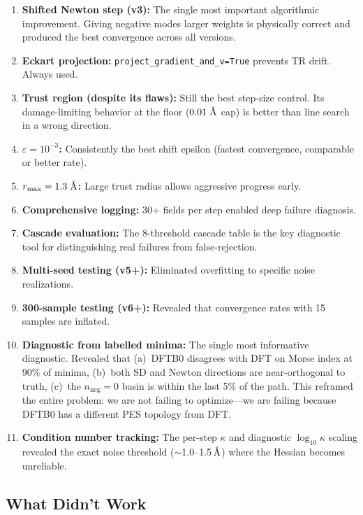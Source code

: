 \documentclass[11pt,a4paper]{article}
\newcommand{\angstrom}{\text{\r{A}}}
\begin{document}
\begin{enumerate}
  \item \textbf{Shifted Newton step (v3):} The single most important algorithmic improvement. Giving negative modes larger weights is physically correct and produced the best convergence across all versions.
  \item \textbf{Eckart projection:} \texttt{project\_gradient\_and\_v=True} prevents TR drift. Always used.
  \item \textbf{Trust region (despite its flaws):} Still the best step-size control. Its damage-limiting behavior at the floor ($0.01\;\angstrom$ cap) is better than line search in a wrong direction.
  \item \textbf{$\varepsilon = 10^{-3}$:} Consistently the best shift epsilon (fastest convergence, comparable or better rate).
  \item \textbf{$r_\text{max} = 1.3\;\angstrom$:} Large trust radius allows aggressive progress early.
  \item \textbf{Comprehensive logging:} 30+ fields per step enabled deep failure diagnosis.
  \item \textbf{Cascade evaluation:} The 8-threshold cascade table is the key diagnostic tool for distinguishing real failures from false-rejection.
  \item \textbf{Multi-seed testing (v5+):} Eliminated overfitting to specific noise realizations.
  \item \textbf{300-sample testing (v6+):} Revealed that convergence rates with 15 samples are inflated.
  \item \textbf{Diagnostic from labelled minima:} The single most informative diagnostic. Revealed that (a)~DFTB0 disagrees with DFT on Morse index at 90\% of minima, (b)~both SD and Newton directions are near-orthogonal to truth, (c)~the $n_\text{neg}=0$ basin is within the last 5\% of the path. This reframed the entire problem: we are not failing to optimize---we are failing because DFTB0 has a different PES topology from DFT.
  \item \textbf{Condition number tracking:} The per-step $\kappa$ and diagnostic $\log_{10}\kappa$ scaling revealed the exact noise threshold ($\sim$1.0--1.5\,$\angstrom$) where the Hessian becomes unreliable.
\end{enumerate}

\subsection{What Didn't Work}
\end{document}
